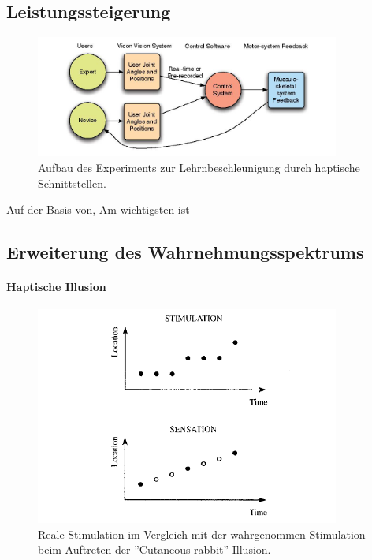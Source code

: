 \documentclass{llncs}					%
\begin{document}
\subsection{Leistungssteigerung}

\begin{figure}[htbp]
	\begin{center}
		\includegraphics[width = 10cm]{Grafiken/17-Lehrnbeschleunigung-Versuchsaufbau.png}
		\caption{Aufbau des Experiments zur Lehrnbeschleunigung durch haptische Schnittstellen\cite{lieberman2007development}.}
		\label{17-Lehrnbeschleunigung-Versuchsaufbau}
	\end{center}
\end{figure}

Auf der Basis von\cite{rupert2000instrumentation},\cite{calhoun2002utilty}
Am wichtigsten ist \cite{lieberman2007development}

\subsection{Erweiterung des Wahrnehmungsspektrums}

\paragraph{Haptische Illusion}

\begin{figure}[htbp]
	\begin{center}
		\includegraphics[width = 10cm]{Grafiken/14-Sensory-Saltation.png}
		\caption{Reale Stimulation im Vergleich mit der wahrgenommen Stimulation beim Auftreten der ''Cutaneous rabbit'' Illusion\cite{Tan:2005:TDS:1198555.1198611}.}
		\label{14-Sensory-Saltation}
	\end{center}
\end{figure}
\end{document}
